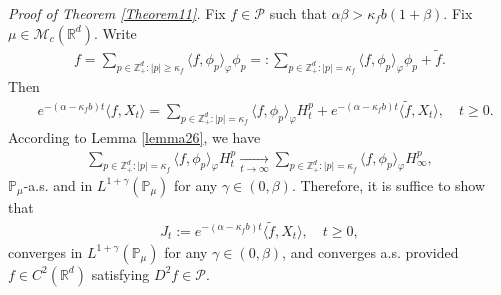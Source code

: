 \documentclass[12pt,a4paper]{amsart}
\theoremstyle{plain}
\theoremstyle{definition}
\numberwithin{equation}{section}
\begin{document}
{\it Proof of Theorem \ref{Theorem11}.}\quad
	Fix  $f \in \mathcal P$ such that $\alpha \beta > \kappa_f b (1+\beta)$.
	Fix $\mu \in \mathcal M_c(\mathbb R^d)$.
	Write
\begin{equation}\begin{split}
    f
    =\sum_{p\in \mathbb Z_+^d:|p|\geq \kappa_f}\langle f,\phi_p\rangle_\varphi \phi_p
    =:
    \sum_{p\in \mathbb Z_+^d:|p|= \kappa_f}\langle f,\phi_p\rangle_\varphi \phi_p+\tilde{f}.
\end{split}\end{equation}
	Then
\begin{align*}
    &e^{-(\alpha-\kappa_fb)t}\langle f,X_t\rangle=
    \sum_{p\in \mathbb Z_+^d:|p|= \kappa_f}\langle f,\phi_p\rangle_\varphi H_t^p+e^{-(\alpha-\kappa_fb)t} \langle \tilde{f},X_t\rangle,
    \quad t\geq 0.
\end{align*}
	According to Lemma \ref{lemma26},
	we have
\begin{equation}\begin{split}
\label{as convergence}
     \sum_{p\in \mathbb{Z}_+^d:|p|= \kappa_f}\langle f,\phi_p\rangle_\varphi H_t^p
     \xrightarrow[t\to \infty]{} \sum_{p\in \mathbb{Z}_+^d:|p|=\kappa_f}\langle f, \phi_p\rangle_{\varphi} H_{\infty}^p,
\end{split}\end{equation}
$\mathbb{P}_{\mu}$-a.s. and in $L^{1+\gamma}(\mathbb{P}_{\mu})$ for any $\gamma\in(0,\beta)$.
	Therefore, it is suffice to show that
\begin{equation}\begin{split}
    J_t
    :=e^{-(\alpha-\kappa_fb)t}\langle \tilde{f},X_t\rangle,
    \quad t\geq 0,
\end{split}\end{equation}
	converges in $L^{1+\gamma}(\mathbb{P}_{\mu})$ for any $\gamma\in(0,\beta)$, and converges a.s. provided $f\in C^2(\mathbb R^d)$ satisfying $D^2f\in \mathcal{P}$.
\end{document}
